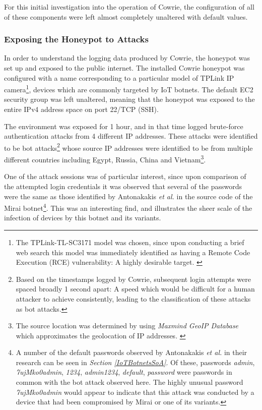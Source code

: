     For this initial investigation into the operation of Cowrie, the configuration of all of  these components were left almost completely unaltered with default values.


\subsubsection{Exposing the Honeypot to Attacks}
\label{ExposingCowrieToAttack}
In order to understand the logging data produced by Cowrie, the honeypot was set up and exposed to the public internet. The installed Cowrie honeypot was configured with a name corresponding to a particular model of TPLink IP camera\footnote{The TPLink-TL-SC3171 model was chosen, since upon conducting a brief web search this model was immediately identified as having a Remote Code Execution (RCE) vulnerability: A highly desirable target. \cite{TPLinkIPCameraRCE}}, devices which are commonly targeted by IoT botnets. The default EC2 security group was left unaltered, meaning that the honeypot was exposed to the entire IPv4 address space on port 22/TCP (SSH). 

The environment was exposed for 1 hour, and in that time logged brute-force authentication attacks from 4 different IP addresses. These attacks were identified to be  bot attacks\footnote{Based on the timestamps logged by Cowrie, subsequent login attempts were spaced broadly 1 second apart: A speed which would be difficult for a human attacker to achieve consistently, leading to the classification of these attacks as bot attacks.} whose source IP addresses were identified to be from multiple different countries including Egypt, Russia, China and Vietnam\footnote{The source location was determined by using \textit{Maxmind GeoIP Database} which approximates the geolocation of IP addresses. \cite{MaxmindGeoipDatabase}}. 

One of the attack sessions was of particular interest, since upon comparison of the attempted login credentials it was observed that several of the passwords were the same as those identified by Antonakakis \textit{et al.} in the source code of the Mirai botnet\footnote{A number of the default passwords observed by Antonakakis \textit{et al.} in their research can be seen in \textit{Section \ref{IoTBotnetsSoA}}. Of these, passwords \textit{admin}, \textit{7ujMko0admin}, \textit{1234}, \textit{admin1234}, \textit{default}, \textit{password} were passwords in common with the bot attack observed here. The highly unusual password \textit{7ujMko0admin} would appear to indicate that this attack was conducted by a device that had been compromised by Mirai or one of its variants.}. \cite{UnderstandingTheMiraiBotnet} This was an interesting find, and illustrates the sheer scale of the infection of devices by this botnet and its variants.

